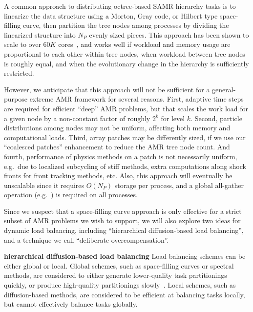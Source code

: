 \documentclass[10pt]{article}
\begin{document}
A common approach to distributing octree-based SAMR hierarchy tasks is
to linearize the data structure using a Morton, Gray code, or Hilbert
type space-filling curve, then partition the tree nodes among
processes by dividing the linearized structure into $N_P$ evenly sized
pieces.  This approach has been shown to scale to over $60K$
cores~\cite{@@@ART}, and works well if workload and memory usage are
proportional to each other within tree nodes, when workload between
tree nodes is roughly equal, and when the evolutionary change in the
hierarchy is sufficiently restricted.

However, we anticipate that this approach will not be sufficient for a
general-purpose extreme AMR framework for several reasons.
%
First, adaptive time steps are required for efficient ``deep'' AMR
problems, but that scales the work load for a given node by a
non-constant factor of roughly $2^k$ for level $k$.
%
Second, particle distributions among nodes may not be uniform, affecting both memory and computational loads.
%
Third, array patches may be differently sized, if we use our
``coalesced patches'' enhancement to reduce the AMR tree node count.
%
And fourth, performance of physics methods on a patch is not
necessarily uniform, e.g.~due to localized subcycling of stiff
methods, extra computations along shock fronts for front tracking
methods, etc.  
%
Also, this approach will eventually be unscalable since it
requires $O(N_P)$ storage per process, and a global all-gather
operation (e.g.~) is required on all processes.

Since we suspect that a space-filling curve approach is only effective
for a strict subset of AMR problems we wish to support, we will also
explore two ideas for dynamic load balancing, including ``hierarchical
diffusion-based load balancing'', and a technique we call
``deliberate overcompensation''.

\textbf{hierarchical diffusion-based load balancing} Load balancing
schemes can be either global or local.  Global schemes, such as
space-filling curves or spectral methods, are considered to either
generate lower-quality task partitionings quickly, or produce
high-quality partitionings slowly~\cite{MeMo09}.  Local schemes,
such as diffusion-based methods, are considered to be efficient
at balancing tasks locally, but cannot effectively balance tasks
globally.
\end{document}
